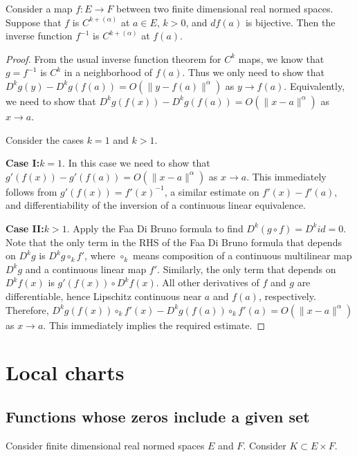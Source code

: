 \begin{theorem}%
  \label{thm:cdh-at-inverse}
  Consider a map \(f\colon E\to F\) between two finite dimensional real normed spaces.
  Suppose that \(f\) is \(C^{k+(\alpha)}\) at \(a \in E\), \(k > 0\), and \(df(a)\) is bijective.
  Then the inverse function \(f^{-1}\) is \(C^{k+(\alpha)}\) at \(f(a)\).
\end{theorem}
\begin{proof}
  From the usual inverse function theorem for \(C^{k}\) maps,
  we know that \(g=f^{-1}\) is \(C^{k}\) in a neighborhood of \(f(a)\).
  Thus we only need to show that \(D^{k}g(y)-D^{k}g(f(a)) = O\left(\|y - f(a)\|^{\alpha}\right)\) as \(y \to f(a)\).
  Equivalently, we need to show that \(D^{k}g(f(x)) - D^{k}g(f(a)) = O\left(\|x - a\|^{\alpha}\right)\) as \(x\to a\).

  Consider the cases \(k = 1\) and \(k > 1\).

  \textbf{Case I:\@\(k = 1\)}. In this case we need to show that
  \(g'(f(x)) - g'(f(a)) = O\left(\|x - a\|^{\alpha}\right)\) as \(x\to a\).
  This immediately follows from \(g'(f(x)) = {f'(x)}^{-1}\),
  a similar estimate on \(f'(x) - f'(a)\),
  and differentiability of the inversion of a continuous linear equivalence.

  \textbf{Case II:\@\(k > 1\)}.
  Apply the Faa Di Bruno formula to find \(D^{k}(g \circ f) = D^{k} id =0\).
  Note that the only term in the RHS of the Faa Di Bruno formula
  that depends on \(D^{k}g\) is \(D^{k}g\circ_{k} f'\),
  where \(\circ_{k}\) means composition of a continuous multilinear map \(D^{k}g\)
  and a continuous linear map \(f'\).
  Similarly, the only term that depends on \(D^{k}f(x)\) is \(g'(f(x))\circ D^{k}f(x)\).
  All other derivatives of \(f\) and \(g\) are differentiable,
  hence Lipschitz continuous near \(a\) and \(f(a)\), respectively.
  Therefore, \(D^{k}g(f(x))\circ_{k}f'(x) - D^{k}g(f(a))\circ_{k}f'(a)=O\left(\|x - a\|^{\alpha}\right)\) as \(x\to a\).
  This immediately implies the required estimate.
\end{proof}

\chapter{Local charts}%
\label{cha:local-charts}

\section{Functions whose zeros include a given set}

\begin{lemma}%
  \label{lem:chart-one-deriv-zero-bdd}
  Consider finite dimensional real normed spaces \(E\) and \(F\).
  Consider \(K \subset E \times F\).
\end{lemma}


